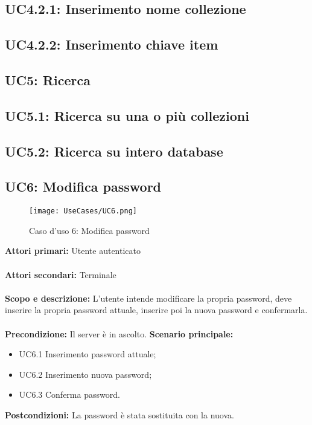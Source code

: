 \documentclass{scalatekids-article}
\begin{document}
\subsection{UC4.2.1: Inserimento nome collezione}

\subsection{UC4.2.2: Inserimento chiave item}

\subsection{UC5: Ricerca}

\subsection{UC5.1: Ricerca su una o più collezioni}

\subsection{UC5.2: Ricerca su intero database}

\subsection{UC6: Modifica password}
\begin{figure}[H]
  \begin{center}
    \texttt{[image: UseCases/UC6.png]}
    \caption*{Caso d'uso 6: Modifica password}
  \end{center}
\end{figure}
\textbf{Attori primari:} Utente autenticato\\ \\
\textbf{Attori secondari:} Terminale\\ \\
\textbf{Scopo e descrizione:} L'utente intende modificare la propria password, deve inserire la propria password attuale, inserire poi la nuova password e confermarla.\\ \\
\textbf{Precondizione:} Il server è in ascolto.
\textbf{Scenario principale:}
\begin{itemize}
\item UC6.1 Inserimento password attuale;
\item UC6.2 Inserimento nuova password;
\item UC6.3 Conferma password.
\end{itemize}
\textbf{Postcondizioni:} La password è stata sostituita con la nuova.
\end{document}
